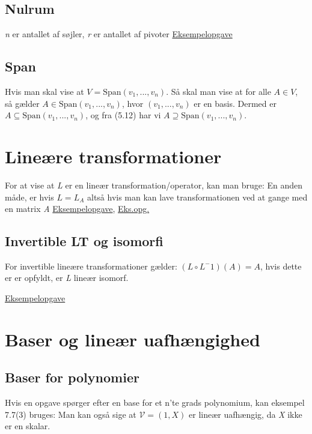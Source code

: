 \documentclass[a4paper,oneside,article]{memoir}
\begin{document}
\section{Nulrum}
\emph{n} er antallet af søjler, \emph{r} er antallet af pivoter
\hyperref[asc:Eksamen 2021 opg 1]{Eksempelopgave}

\section{Span}
Hvis man skal vise at $V=\text{Span}(v_1,...,v_n)$.
Så skal man vise at for alle $A\in V$, så gælder $A \in \text{Span}(v_1,...,v_n)$, hvor $(v_1,...,v_n)$ er en basis. Dermed er $A\subseteq \text{Span}(v_1,...,v_n)$, og fra (5.12) har vi $A\supseteq \text{Span}(v_1,...,v_n)$.


\chapter{Lineære transformationer} \label{ch:trans}
For at vise at \emph{L} er en lineær transformation/operator, kan man bruge: 
En anden måde, er hvis $L=L_A$ altså hvis man kan lave transformationen ved at gange med en matrix \emph{A}
\hyperref[asc:Eksamen 2023 opg 3]{Eksempelopgave}, \hyperref[asc:Reeksamen 2022 opg 3]{Eks.opg.}

\section{Invertible LT og isomorfi}
For invertible lineære transformationer gælder: $(L\circ L^-1)(A)=A$, hvis dette er er opfyldt, er \emph{L} lineær isomorf. 

\hyperref[asc:Reeksamen 2023 opg 3]{Eksempelopgave}


\chapter{Baser og lineær uafhængighed} \label{ch:baser}

\section{Baser for polynomier}
Hvis en opgave spørger efter en base for et n'te grads polynomium, kan eksempel 7.7(3) bruges: 
Man kan også sige at $\mathcal{V}=(1,X)$ er lineær uafhængig, da \emph{X} ikke er en skalar. 
\end{document}
